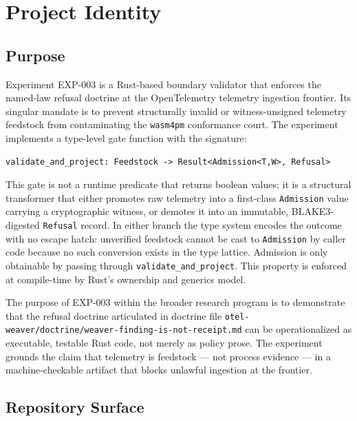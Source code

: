 
\section{Project Identity}
\label{sec:otel-weaver-exp-003-live-check-to-refusal-identity}

\subsection{Purpose}
\label{sec:otel-weaver-exp-003-live-check-to-refusal-identity-purpose}

Experiment EXP-003 is a Rust-based boundary validator that enforces the named-law refusal
doctrine at the OpenTelemetry telemetry ingestion frontier. Its singular mandate is to
prevent structurally invalid or witness-unsigned telemetry feedstock from contaminating
the \texttt{wasm4pm} conformance court. The experiment implements a type-level gate
function with the signature:

\begin{verbatim}
validate_and_project: Feedstock -> Result<Admission<T,W>, Refusal>
\end{verbatim}

This gate is not a runtime predicate that returns boolean values; it is a structural
transformer that either promotes raw telemetry into a first-class \texttt{Admission}
value carrying a cryptographic witness, or demotes it into an immutable, BLAKE3-digested
\texttt{Refusal} record. In either branch the type system encodes the outcome with
no escape hatch: unverified feedstock cannot be cast to \texttt{Admission} by caller
code because no such conversion exists in the type lattice. Admission is only obtainable
by passing through \texttt{validate\_and\_project}. This property is enforced at
compile-time by Rust's ownership and generics model.

The purpose of EXP-003 within the broader research program is to demonstrate that
the refusal doctrine articulated in doctrine file
\texttt{otel-weaver/doctrine/weaver-finding-is-not-receipt.md} can be operationalized
as executable, testable Rust code, not merely as policy prose. The experiment grounds
the claim that telemetry is feedstock --- not process evidence --- in a machine-checkable
artifact that blocks unlawful ingestion at the frontier.

\subsection{Repository Surface}
\label{sec:otel-weaver-exp-003-live-check-to-refusal-identity-repo}

